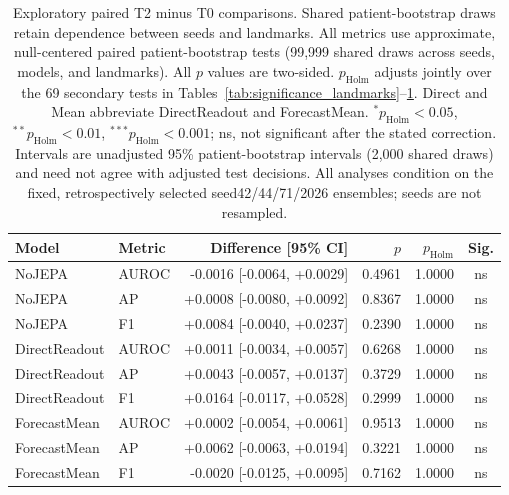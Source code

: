 \begin{table}[t]
\centering
\small
\caption{Exploratory paired T2 minus T0 comparisons. Shared patient-bootstrap draws retain dependence between seeds and landmarks. All metrics use approximate, null-centered paired patient-bootstrap tests (99,999 shared draws across seeds, models, and landmarks). All $p$ values are two-sided. $p_{\mathrm{Holm}}$ adjusts jointly over the 69 secondary tests in Tables~\ref{tab:significance_landmarks}--\ref{tab:significance_longitudinal}. Direct and Mean abbreviate DirectReadout and ForecastMean. $^{*}p_{\mathrm{Holm}}<0.05$, $^{**}p_{\mathrm{Holm}}<0.01$, $^{***}p_{\mathrm{Holm}}<0.001$; ns, not significant after the stated correction. Intervals are unadjusted 95\% patient-bootstrap intervals (2,000 shared draws) and need not agree with adjusted test decisions. All analyses condition on the fixed, retrospectively selected seed42/44/71/2026 ensembles; seeds are not resampled.}
\label{tab:significance_longitudinal}
\begin{tabular}{llrrrc}
\toprule
Model & Metric & Difference [95\% CI] & $p$ & $p_{\mathrm{Holm}}$ & Sig. \\
\midrule
NoJEPA & AUROC & -0.0016 [-0.0064, +0.0029] & 0.4961 & 1.0000 & ns \\
NoJEPA & AP & +0.0008 [-0.0080, +0.0092] & 0.8367 & 1.0000 & ns \\
NoJEPA & F1 & +0.0084 [-0.0040, +0.0237] & 0.2390 & 1.0000 & ns \\
DirectReadout & AUROC & +0.0011 [-0.0034, +0.0057] & 0.6268 & 1.0000 & ns \\
DirectReadout & AP & +0.0043 [-0.0057, +0.0137] & 0.3729 & 1.0000 & ns \\
DirectReadout & F1 & +0.0164 [-0.0117, +0.0528] & 0.2999 & 1.0000 & ns \\
ForecastMean & AUROC & +0.0002 [-0.0054, +0.0061] & 0.9513 & 1.0000 & ns \\
ForecastMean & AP & +0.0062 [-0.0063, +0.0194] & 0.3221 & 1.0000 & ns \\
ForecastMean & F1 & -0.0020 [-0.0125, +0.0095] & 0.7162 & 1.0000 & ns \\
\bottomrule
\end{tabular}
\end{table}
